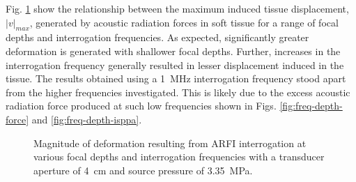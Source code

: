 			Fig. \ref{fig:freq-depth-maxDisp} show the relationship between the maximum induced tissue displacement, $\left| v \right|_{max}$, generated by acoustic radiation forces in soft tissue for a range of focal depths and interrogation frequencies. As expected, significantly greater deformation is generated with shallower focal depths. Further, increases in the interrogation frequency generally resulted in lesser displacement induced in the tissue. The results obtained using a \SI{1}{\MHz} interrogation frequency stood apart from the higher frequencies investigated. This is likely due to the excess acoustic radiation force produced at such low frequencies shown in Figs. \ref{fig:freq-depth-force} and \ref{fig:freq-depth-isppa}.

			\begin{figure}[!htb]
				\centering
				\caption[ARFI-induced deformation at various depths and interrogation frequencies]{Magnitude of deformation resulting from ARFI interrogation at various focal depths and interrogation frequencies with a transducer aperture of \SI{4}{\cm} and source pressure of \SI{3.35}{\MPa}.}
				\label{fig:freq-depth-maxDisp}
			\end{figure}

